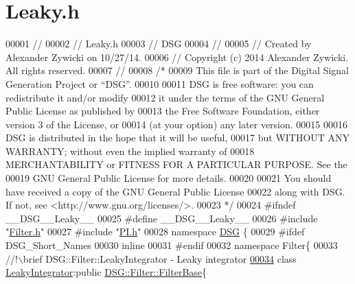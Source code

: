 \hypertarget{_leaky_8h_source}{\section{Leaky.\+h}
\label{_leaky_8h_source}
}

\begin{DoxyCode}
00001 \textcolor{comment}{//}
00002 \textcolor{comment}{//  Leaky.h}
00003 \textcolor{comment}{//  DSG}
00004 \textcolor{comment}{//}
00005 \textcolor{comment}{//  Created by Alexander Zywicki on 10/27/14.}
00006 \textcolor{comment}{//  Copyright (c) 2014 Alexander Zywicki. All rights reserved.}
00007 \textcolor{comment}{//}
00008 \textcolor{comment}{/*}
00009 \textcolor{comment}{ This file is part of the Digital Signal Generation Project or “DSG”.}
00010 \textcolor{comment}{}
00011 \textcolor{comment}{ DSG is free software: you can redistribute it and/or modify}
00012 \textcolor{comment}{ it under the terms of the GNU General Public License as published by}
00013 \textcolor{comment}{ the Free Software Foundation, either version 3 of the License, or}
00014 \textcolor{comment}{ (at your option) any later version.}
00015 \textcolor{comment}{}
00016 \textcolor{comment}{ DSG is distributed in the hope that it will be useful,}
00017 \textcolor{comment}{ but WITHOUT ANY WARRANTY; without even the implied warranty of}
00018 \textcolor{comment}{ MERCHANTABILITY or FITNESS FOR A PARTICULAR PURPOSE.  See the}
00019 \textcolor{comment}{ GNU General Public License for more details.}
00020 \textcolor{comment}{}
00021 \textcolor{comment}{ You should have received a copy of the GNU General Public License}
00022 \textcolor{comment}{ along with DSG.  If not, see <http://www.gnu.org/licenses/>.}
00023 \textcolor{comment}{ */}
00024 \textcolor{preprocessor}{#ifndef \_\_DSG\_\_Leaky\_\_}
00025 \textcolor{preprocessor}{#define \_\_DSG\_\_Leaky\_\_}
00026 \textcolor{preprocessor}{#include "\hyperlink{_filter_8h}{Filter.h}"}
00027 \textcolor{preprocessor}{#include "\hyperlink{_p_i_8h}{PI.h}"}
00028 \textcolor{keyword}{namespace }\hyperlink{namespace_d_s_g}{DSG} \{
00029 \textcolor{preprocessor}{#ifdef DSG\_Short\_Names}
00030     \textcolor{keyword}{inline}
00031 \textcolor{preprocessor}{#endif}
00032     \textcolor{keyword}{namespace }Filter\{\textcolor{comment}{}
00033 \textcolor{comment}{        //!\(\backslash\)brief DSG::Filter::LeakyIntegrator - Leaky integrator }
\hypertarget{_leaky_8h_source_l00034}{}\hyperlink{class_d_s_g_1_1_filter_1_1_leaky_integrator}{00034} \textcolor{comment}{}        \textcolor{keyword}{class }\hyperlink{class_d_s_g_1_1_filter_1_1_leaky_integrator}{LeakyIntegrator}:\textcolor{keyword}{public} \hyperlink{class_d_s_g_1_1_filter_1_1_filter_base}{DSG::Filter::FilterBase}\{

\end{DoxyCode}
